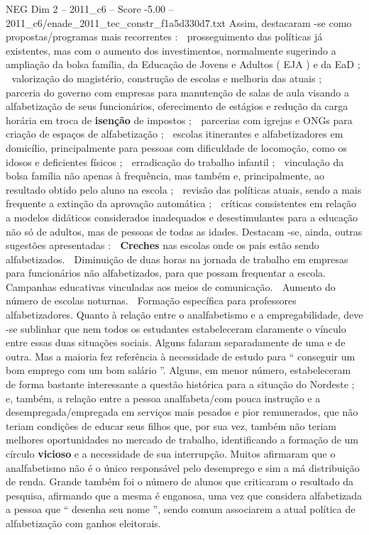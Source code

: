 \begin{textsample}{NEG Dim 2 – 2011\_c6 – Score -5.00 – 2011\_c6/enade\_2011\_tec\_constr\_f1a5d330d7.txt}
Assim, destacaram -se como propostas/programas mais recorrentes :  prosseguimento das políticas já existentes, mas com o aumento dos investimentos, normalmente sugerindo a ampliação da bolsa família, da Educação de Jovens e Adultos ( EJA ) e da EaD ;  valorização do magistério, construção de escolas e melhoria das atuais ;  parceria do governo com empresas para manutenção de salas de aula visando a alfabetização de seus funcionários, oferecimento de estágios e redução da carga horária em troca de \textbf{isenção} de impostos ;  parcerias com igrejas e ONGs para criação de espaços de alfabetização ;  escolas itinerantes e alfabetizadores em domicílio, principalmente para pessoas com dificuldade de locomoção, como os idosos e deficientes físicos ;  erradicação do trabalho infantil ;  vinculação da bolsa família não apenas à frequência, mas também e, principalmente, ao resultado obtido pelo aluno na escola ;  revisão das políticas atuais, sendo a mais frequente a extinção da aprovação automática ;  críticas consistentes em relação a modelos didáticos considerados inadequados e desestimulantes para a educação não só de adultos, mas de pessoas de todas as idades.
Destacam -se, ainda, outras sugestões apresentadas :  \textbf{Creches} nas escolas onde os pais estão sendo alfabetizados.  Diminuição de duas horas na jornada de trabalho em empresas para funcionários não alfabetizados, para que possam frequentar a escola.  Campanhas educativas vinculadas aos meios de comunicação.  Aumento do número de escolas noturnas.  Formação específica para professores alfabetizadores.
Quanto à relação entre o analfabetismo e a empregabilidade, deve -se sublinhar que nem todos os estudantes estabeleceram claramente o vínculo entre essas duas situações sociais.
Alguns falaram separadamente de uma e de outra.
Mas a maioria fez referência à necessidade de estudo para “ conseguir um bom emprego com um bom salário ”.
Alguns, em menor número, estabeleceram de forma bastante interessante a questão histórica para a situação do Nordeste ; e, também, a relação entre a pessoa analfabeta/com pouca instrução e a desempregada/empregada em serviços mais pesados e pior remunerados, que não teriam condições de educar seus filhos que, por sua vez, também não teriam melhores oportunidades no mercado de trabalho, identificando a formação de um círculo \textbf{vicioso} e a necessidade de sua interrupção.
Muitos afirmaram que o analfabetismo não é o único responsável pelo desemprego e sim a má distribuição de renda.
Grande também foi o número de alunos que criticaram o resultado da pesquisa, afirmando que a mesma é enganosa, uma vez que considera alfabetizada a pessoa que “ desenha seu nome ”, sendo comum associarem a atual política de alfabetização com ganhos eleitorais.

\end{textsample}
